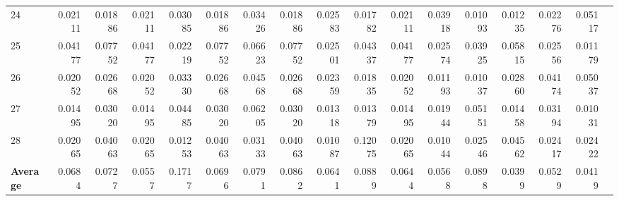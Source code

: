 \documentclass{article}
\begin{document}
\begin{landscape}
\begin{table}[htbp]
\begin{tabular}{lrrrrrrrrrrrrrrrr}
24 & 0.02111 & 0.01886 & 0.02111 & 0.03085 & 0.01886 & 0.03426 & 0.01886 & 0.02583 & 0.01782 & 0.02111 & 0.03918 & 0.01093 & 0.01235 & 0.02276 & 0.05117 \\
25 & 0.04177 & 0.07752 & 0.04177 & 0.02219 & 0.07752 & 0.06623 & 0.07752 & 0.02501 & 0.04337 & 0.04177 & 0.02574 & 0.03925 & 0.05815 & 0.02556 & 0.01179 \\
26 & 0.02052 & 0.02668 & 0.02052 & 0.03330 & 0.02668 & 0.04568 & 0.02668 & 0.02359 & 0.01835 & 0.02052 & 0.01193 & 0.01037 & 0.02860 & 0.04174 & 0.05037 \\
27 & 0.01495 & 0.03020 & 0.01495 & 0.04485 & 0.03020 & 0.06205 & 0.03020 & 0.01318 & 0.01379 & 0.01495 & 0.01944 & 0.05151 & 0.01458 & 0.03194 & 0.01031 \\
28 & 0.02065 & 0.04063 & 0.02065 & 0.01253 & 0.04063 & 0.03133 & 0.04063 & 0.01087 & 0.12075 & 0.02065 & 0.01044 & 0.02546 & 0.04562 & 0.02417 & 0.02422 \\
\textbf{Average} & 0.0684 & 0.0727 & 0.0557 & 0.1717 & 0.0696 & 0.0791 & 0.0862 & 0.0641 & 0.0889 & 0.0644 & 0.0568 & 0.0898 & 0.0399 & 0.0529 & 0.0419\\
\bottomrule
\end{tabular}
\end{table}
\end{landscape}
\end{document}
